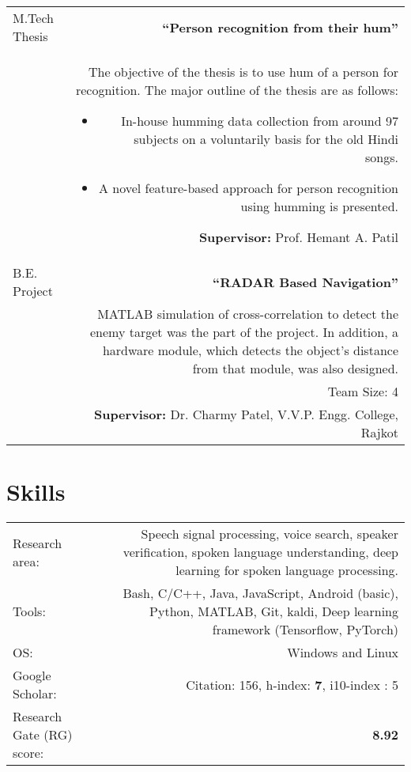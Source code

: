 \documentclass[10pt]{article}
\begin{document}
\begin{tabular}{L!{\VRule}R}
M.Tech Thesis&\textbf{``Person recognition from their hum''}\\&The objective of the thesis is to use hum of a person for recognition. The major outline of the thesis are as follows: 
\vspace{-0.3cm}
\begin{itemize}
	\setlength\itemsep{0em}
	\item In-house humming data collection from around 97 subjects on a voluntarily basis for the old Hindi songs. 
	\item A novel feature-based approach for person recognition using humming is presented.
\end{itemize} 
\textbf{Supervisor:} Prof. Hemant A. Patil\vspace{0.5cm}\\
B.E. Project&\textbf{``RADAR Based Navigation''}\\&MATLAB simulation of cross-correlation to detect the enemy target was the part of the project. In addition, a hardware module, which detects the object's  distance from that module, was also designed.\\& Team Size: 4\\&\vspace{0.01cm} \textbf{Supervisor:} Dr. Charmy Patel, V.V.P. Engg. College, Rajkot
\end{tabular}
\vspace*{0.3cm}
\section*{Skills}
\begin{tabular}{L!{\VRule}R}
Research area: &Speech signal processing, voice search, speaker verification, spoken language understanding, deep learning for spoken language processing.\vspace{0.2cm}\\
Tools:& Bash, C/C++, Java, JavaScript, Android (basic), Python, MATLAB,  Git, kaldi, Deep learning framework (Tensorflow, PyTorch) \vspace{0.2cm}\\
OS: & Windows and Linux \vspace{0.2cm}\\
Google Scholar: & {Citation}: 156, {h-index}: \textbf{7}, {i10-index} : 5 \vspace{0.2cm}\\
Research Gate (RG) score: & \textbf{8.92}
\end{tabular}
\end{document}
